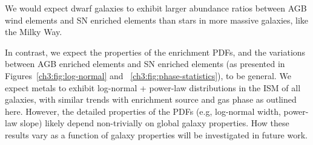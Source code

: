 We would expect dwarf galaxies to exhibit larger abundance ratios between AGB wind elements and SN enriched elements than stars in more massive galaxies, like the Milky Way.

In contrast, we expect the properties of the enrichment PDFs, and the variations between AGB enriched elements and SN enriched elements (as presented in Figures~\ref{ch3:fig:log-normal} and ~\ref{ch3:fig:phase-statistics}), to be general. We expect metals to exhibit log-normal + power-law distributions in the ISM of all galaxies, with similar trends with enrichment source and gas phase as outlined here. However, the detailed properties of the PDFs (e.g, log-normal width, power-law slope) likely depend non-trivially on global galaxy properties. How these results vary as a function of galaxy properties will be investigated in future work.


